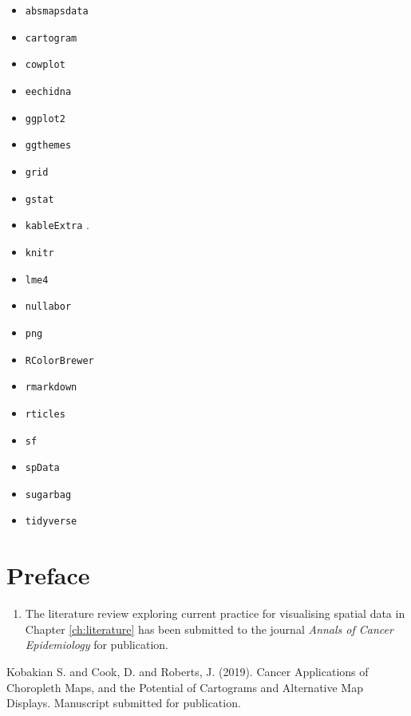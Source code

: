 \documentclass{monashthesis}
\begin{document}
\begin{itemize}
\tightlist
\item
  \texttt{absmapsdata} \autocite{ABSmaps}
\item
  \texttt{cartogram} \autocite{cartogram}
\item
  \texttt{cowplot} \autocite{cowplot}
\item
  \texttt{eechidna} \autocite{eechidna}
\item
  \texttt{ggplot2} \autocite{ggplot2}
\item
  \texttt{ggthemes} \autocite{ggthemes}
\item
  \texttt{grid} \autocite{grid}
\item
  \texttt{gstat} \autocite{gstat}
\item
  \texttt{kableExtra} \autocite{kableExtra}.
\item
  \texttt{knitr} \autocite{knitr}
\item
  \texttt{lme4} \autocite{lme4}
\item
  \texttt{nullabor} \autocite{nullabor}
\item
  \texttt{png} \autocite{png}
\item
  \texttt{RColorBrewer} \autocite{RColorBrewer}
\item
  \texttt{rmarkdown} \autocite{rmarkdown}
\item
  \texttt{rticles} \autocite{rticles}
\item
  \texttt{sf} \autocite{sf}
\item
  \texttt{spData} \autocite{spData}
\item
  \texttt{sugarbag} \autocite{sugarbag}
\item
  \texttt{tidyverse} \autocite{tidyverse}
\end{itemize}

\hypertarget{preface}{%
\chapter*{Preface}\label{preface}}

\begin{enumerate}
\def\labelenumi{\arabic{enumi}.}
\tightlist
\item
  The literature review exploring current practice for visualising spatial data in Chapter \ref{ch:literature} has been submitted to the journal \emph{Annals of Cancer Epidemiology} for publication.
\end{enumerate}

Kobakian S. and Cook, D. and Roberts, J. (2019). Cancer Applications of Choropleth Maps, and the Potential of Cartograms and Alternative Map Displays. Manuscript submitted for publication.
\end{document}
